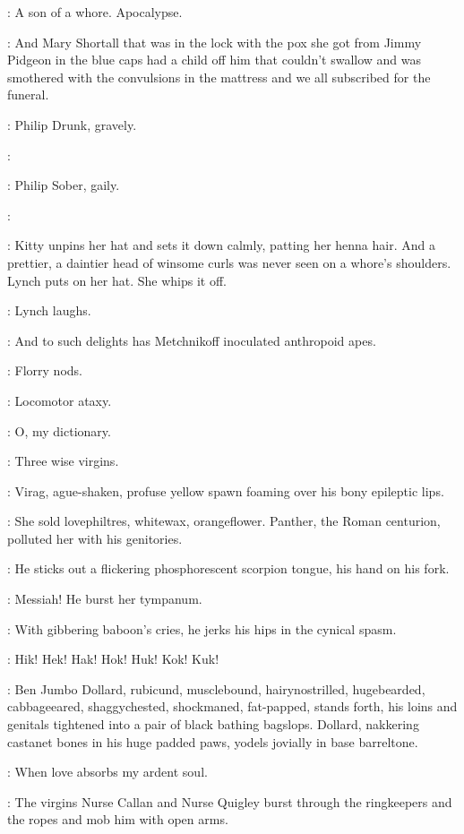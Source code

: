 \Virag:
A son of a whore.
Apocalypse.

\Kitty[2]:
And Mary Shortall that was in the lock with the pox
she got from Jimmy Pidgeon in the blue caps
had a child off him that couldn't swallow
and was smothered with the convulsions in the mattress
and we all subscribed for the funeral.

:
Philip Drunk,
gravely.

\PhilipDrunk:

:
Philip Sober,
gaily.

\PhilipSober:

:
Kitty unpins her hat and sets it down calmly,
patting her henna hair.
And a prettier,
a daintier head of winsome curls was never seen on a whore's shoulders.
Lynch puts on her hat.
She whips it off.

:
Lynch laughs.

\Lynch:
And to such delights has Metchnikoff inoculated anthropoid apes.

:
Florry nods.

\Florry:
Locomotor ataxy.

\Zoe:
O,
my dictionary.

\Lynch:
Three wise virgins.

:
Virag,
ague-shaken,
profuse yellow spawn foaming over his bony epileptic lips.

\Virag:
She sold lovephiltres,
whitewax,
orangeflower.
Panther,
the Roman centurion,
polluted her with his genitories.

:
He sticks out a flickering phosphorescent scorpion tongue,
his hand on his fork.

\Virag:
Messiah!
He burst her tympanum.

:
With gibbering baboon's cries,
he jerks his hips in the cynical spasm.

\Virag:
Hik!
Hek!
Hak!
Hok!
Huk!
Kok!
Kuk!

:
Ben Jumbo Dollard,
rubicund,
musclebound,
hairynostrilled,
hugebearded,
cabbageeared,
shaggychested,
shockmaned,
fat-papped,
stands forth,
his loins and genitals tightened into a pair of black bathing bagslops.
Dollard,
nakkering castanet bones in his huge padded paws,
yodels jovially in base barreltone.

\BenDollard:
When love absorbs my ardent soul.

:
The virgins Nurse Callan and Nurse Quigley burst through the ringkeepers
and the ropes and mob him with open arms.

